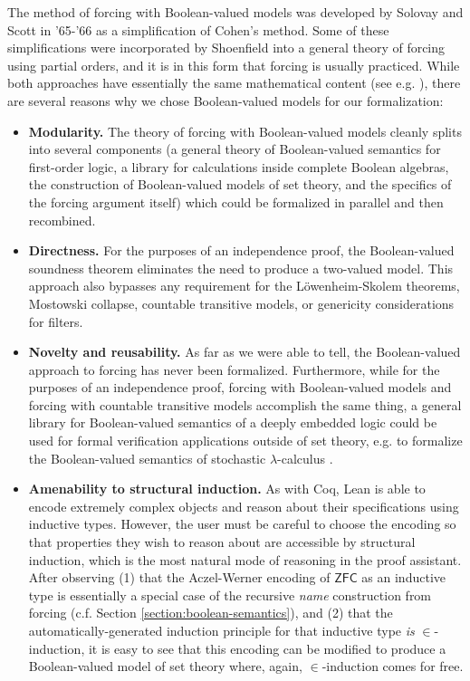 \documentclass[sigplan,10pt,review, anonymous]{acmart}
\theoremstyle{definition}
\begin{document}
The method of forcing with Boolean-valued models was developed by Solovay and Scott in '65-'66 \cite{scott1967proof,scott-solovay} as a simplification of Cohen's method.
Some of these simplifications were incorporated by Shoenfield \cite{shoenfield1971unramified} into a general theory of forcing using partial orders, and it is in this form that forcing is usually practiced.
While both approaches have essentially the same mathematical content (see e.g. \cite{kunen2014set, jech2013set, moore2019method}), there are several reasons why we chose Boolean-valued models for our formalization:
\begin{itemize}
  \item \textbf{Modularity.}
  The theory of forcing with Boolean-valued models cleanly splits into several components
  (a general theory of Boolean-valued semantics for first-order logic, a library for calculations inside complete Boolean algebras, the construction of Boolean-valued models of set theory, and the specifics of the forcing argument itself)
  which could be formalized in parallel and then recombined.

  \item \textbf{Directness.}
  For the purposes of an independence proof, the Boolean-valued soundness theorem eliminates the need to produce a two-valued model.
  This approach also bypasses any requirement for the L\"owenheim-Skolem theorems, Mostowski collapse, countable transitive models, or genericity considerations for filters.

  \item \textbf{Novelty and reusability.}
  As far as we were able to tell, the Boolean-valued approach to forcing has never been formalized.
  Furthermore, while for the purposes of an independence proof, forcing with Boolean-valued models and forcing with countable transitive models accomplish the same thing, a general library for Boolean-valued semantics of a deeply embedded logic could be used for formal verification applications outside of set theory,
  e.g. to formalize the Boolean-valued semantics of stochastic $\lambda$-calculus \cite{scott2014stochastic, bacci2018boolean}.

  \item \textbf{Amenability to structural induction.}
  As with Coq, Lean is able to encode extremely complex objects and reason about their specifications using inductive types.
  However, the user must be careful to choose the encoding so that properties they wish to reason about are accessible by structural induction, which is the most natural mode of reasoning in the proof assistant.
  After observing (1) that the Aczel-Werner encoding of $\mathsf{ZFC}$ as an inductive type is essentially a special case of the recursive \emph{name} construction from forcing (c.f. Section \ref{section:boolean-semantics}),
  and (2) that the automatically-generated induction principle for that inductive type \emph{is} $\in$-induction,
  it is easy to see that this encoding can be modified to produce a Boolean-valued model of set theory where, again, $\in$-induction comes for free.
\end{itemize}
\end{document}
